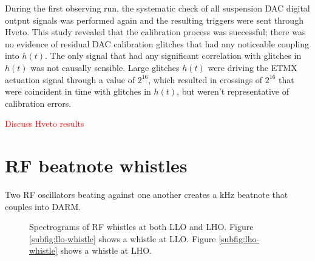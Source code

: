 During the first observing run, the systematic check of all suspension DAC 
digital output signals was performed again and the resulting triggers were 
sent through Hveto. This study revealed that the calibration process was 
successful; there was no evidence of residual DAC calibration glitches that 
had any noticeable coupling into $h(t)$. The only signal that had any 
significant correlation with glitches in $h(t)$ was not causally sensible. 
Large glitches $h(t)$ were driving the ETMX actuation signal through a value of 
$2^{16}$, which resulted in crossings of $2^{16}$ that were coincident in time 
with glitches in $h(t)$, but weren't representative of calibration errors.

\textcolor{red}{Discuss Hveto results}

\section{RF beatnote whistles}

Two RF oscillators beating against one another creates a kHz beatnote that couples 
into DARM.

\begin{figure}[ht!]%
\centering
{}
  
\caption[Spectrograms of RF whistles]{Spectrograms of RF whistles at %
         both LLO and LHO. Figure \ref{subfig:llo-whistle} shows a %
         whistle at LLO. Figure \ref{subfig:lho-whistle} shows a whistle %
         at LHO.
         }
\end{figure}\label{fig:whistle-spectrograms}

